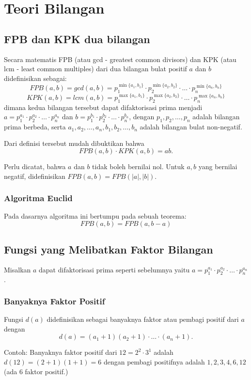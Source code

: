 \documentclass[11pt]{scrartcl}
\begin{document}
    
\section{Teori Bilangan}
    \subsection{FPB dan KPK dua bilangan}
    Secara matematis FPB (atau gcd - greatest common divisors) dan KPK (atau lcm - least common multiples) dari dua bilangan bulat positif $a$ dan $b$ 
    didefinisikan sebagai:
    $$FPB(a,b) = gcd(a,b) = p_1^{\min\{a_1,b_1\}}\cdot p_2^{\min\{a_2,b_2\}} \cdot \ldots \cdot p_n^{\min\{a_n,b_n\}}$$
    $$KPK(a,b) = lcm(a,b) =p_1^{\max\{a_1,b_1\}}\cdot p_2^{\max\{a_2,b_2\}} \cdot \ldots \cdot p_n^{\max\{a_n,b_n\}}$$
    dimana kedua bilangan tersebut dapat difaktorisasi prima menjadi
    $a=p_1^{a_1}\cdot p_2^{a_2}\cdot \ldots \cdot p_n^{a_n}$ dan $b=p_1^{b_1}\cdot p_2^{b_2} \cdot \ldots \cdot p_n^{b_n}$, dengan $p_1,p_2,\dots,p_n$ adalah bilangan prima berbeda, serta $a_1,a_2,\dots,a_n,b_1,b_2,\dots,b_n$ adalah bilangan bulat non-negatif.
    
    Dari definisi tersebut mudah dibuktikan bahwa
    $$FPB(a,b) \cdot KPK(a,b) = ab.$$
    
    Perlu dicatat, bahwa $a$ dan $b$ tidak boleh bernilai nol. Untuk $a,b$ yang bernilai negatif, didefinisikan $FPB(a,b) = FPB(|a|,|b|)$.
    \subsubsection{Algoritma Euclid}
    Pada dasarnya algoritma ini bertumpu pada sebuah teorema:
    $$FPB(a,b) = FPB(a,b-a)$$
    
    \subsection{Fungsi yang Melibatkan Faktor Bilangan}
    Misalkan $a$ dapat difaktorisasi prima seperti sebelumnya yaitu $a=p_1^{a_1}\cdot p_2^{a_2}\cdot \ldots \cdot p_n^{a_n}$.
    \subsubsection{Banyaknya Faktor Positif}
    Fungsi $d(a)$ didefinisikan sebagai banyaknya faktor atau pembagi positif dari $a$ dengan
    $$d(a) = (a_1+1)(a_2+1)\cdot \ldots \cdot (a_n+1).$$
    
    Contoh: Banyaknya faktor positif dari $12= 2^2 \cdot 3^1$ adalah $d(12)=(2+1)(1+1)=6$ dengan pembagi positifnya adalah $1,2,3,4,6,12$ (ada 6 faktor positif.)
    
\end{document}
